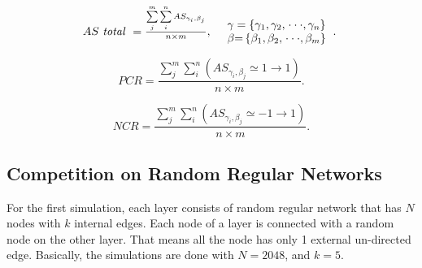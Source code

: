 \documentclass[english]{cccconf}
\begin{document}
\begin{equation}
\begin{array}{cl}
AS\mbox{ \textit{total} } = \frac{{\sum\limits_j^m {\sum\limits_i^n {A{S_{{\gamma _i},{\beta _j}}}} } }}{{n \times m }}, &
\begin{array}{l}
\gamma  = \left\{ {{\gamma _{\rm{1}}},{\gamma _{\rm{2}}},\left. {\cdot\cdot\cdot,{\gamma _n}} \right\}} \right.\\
\beta {\rm{ = }}\left\{ {{\beta _{\rm{1}}},{\beta _{\rm{2}}},\left. {\cdot\cdot\cdot,{\beta _m}} \right\}} \right.
\end{array}.\
\end{array}
\end{equation}

\begin{equation}
PCR = \frac{{\sum\limits_j^m {\sum\limits_i^n {(A{S_{{\gamma _i},{\beta _j}}} \simeq  1 \to 1)} } }}{{n \times m}}.
\end{equation}

\begin{equation}
NCR = \frac{{\sum\limits_j^m {\sum\limits_i^n {(A{S_{{\gamma _i},{\beta _j}}} \simeq   - 1 \to 1)} } }}{{n \times m}}.
\end{equation}

\subsection{Competition on Random Regular Networks}
For the first simulation, each layer consists of random regular network that has $N$ nodes with $k$ internal edges\cite{kimsangwoo2012, bela2001}. Each node of a layer is connected with a random node on the other layer. That means all the node has only 1 external un-directed edge. Basically, the simulations are done with $N=2048$, and $k=5$. 
\end{document}
